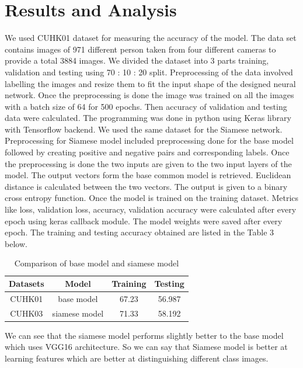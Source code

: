 \documentclass{article}[12pt,a4paper]
\begin{document}
\section{Results and Analysis}
We used CUHK01 dataset for measuring the accuracy of the model. The data set contains images of 971 different person taken from four different cameras to provide a total 3884 images.
We divided the dataset into 3 parts training, validation and testing using 70 : 10 : 20 split. Preprocessing of the data involved labelling the images and resize them to fit the input shape of the designed neural network. Once the preprocessing is done the image was trained on all the images with a batch size of 64 for 500 epochs. Then accuracy of validation and testing data were calculated. The programming was done in python using Keras library with Tensorflow backend. We used the same dataset for the Siamese network. Preprocessing for Siamese model included preprocessing done for the base model followed by creating positive and negative pairs and corresponding labels. Once the preprocessing is done the two inputs are given to the two input layers of the model. The output vectors form the base common model is retrieved. Euclidean distance is calculated between the two vectors. The output is given to a binary cross entropy function. Once the model is trained on the training dataset. Metrics like loss, validation loss,  accuracy, validation accuracy were calculated after every epoch using keras callback module. The model weights were saved after every epoch. 
The training and testing accuracy obtained are listed in the Table 3 below. 

\begin{table}[b]
    \centering
    \begin{tabular}{| c | c | c | c |} \hline
         Datasets & Model & Training & Testing \\ \hline
         CUHK01 & base model & 67.23 & 56.987 \\ \hline
         CUHK03 & siamese model & 71.33 & 58.192 \\ \hline
    \end{tabular}
    \caption{Comparison of base model and siamese model}
    \label{tab:my_label}
\end{table}
\vspace{3em}
We can see that the siamese model performs slightly better to the base model which uses VGG16 architecture. So we can say that Siamese model is better at learning features which are better at distinguishing different class images.
\end{document}
